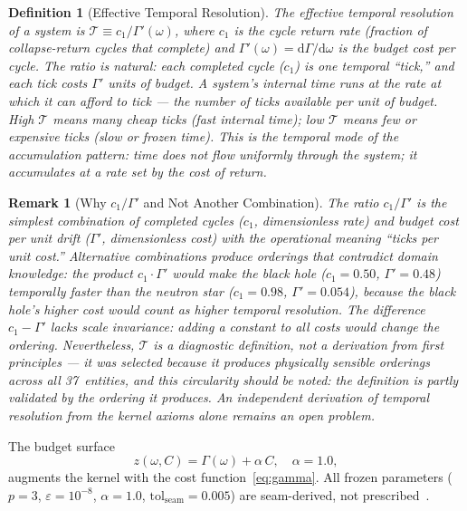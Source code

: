 \documentclass[
  aps,
  prd,
  twocolumn,
  superscriptaddress,
  nofootinbib,
  floatfix
]{revtex4-2}
\newtheorem{definition}[theorem]{Definition}
\newtheorem{remark}{Remark}
\newcommand{\Gam}{\Gamma}
\newcommand{\eps}{\varepsilon}
\newcommand{\tolseam}{\mathrm{tol}_{\mathrm{seam}}}
\newcommand{\dd}{\mathrm{d}}
\newcommand{\beq}{\begin{equation}}
\newcommand{\eeq}{\end{equation}}
\begin{document}
\begin{definition}[Effective Temporal Resolution]\label{def:temporal}
The \emph{effective temporal resolution} of a system is
$\mathcal{T} \equiv c_1 / \Gam'(\omega)$,
where $c_1$ is the cycle return rate (fraction of
collapse-return cycles that complete) and $\Gam'(\omega) =
\dd\Gam/\dd\omega$ is the budget cost per cycle.  The ratio
is natural: each completed cycle ($c_1$) is one temporal
``tick,'' and each tick costs $\Gam'$ units of budget.  A
system's internal time runs at the rate at which it can
afford to tick --- the number of ticks available per unit of
budget.  High $\mathcal{T}$ means many cheap ticks (fast
internal time); low $\mathcal{T}$ means few or expensive
ticks (slow or frozen time).  This is the temporal mode of
the accumulation pattern: time does not flow uniformly
through the system; it accumulates at a rate set by the cost
of return.
\end{definition}

\begin{remark}[Why $c_1/\Gam'$ and Not Another Combination]
\label{rem:temporal_choice}
The ratio $c_1/\Gam'$ is the simplest combination of
completed cycles ($c_1$, dimensionless rate) and budget cost
per unit drift ($\Gam'$, dimensionless cost) with the
operational meaning ``ticks per unit cost.''
Alternative combinations produce orderings that contradict
domain knowledge: the product $c_1 \cdot \Gam'$ would make
the black hole ($c_1 = 0.50$, $\Gam' = 0.48$) temporally
\emph{faster} than the neutron star ($c_1 = 0.98$,
$\Gam' = 0.054$), because the black hole's higher cost
would count as higher temporal resolution.  The difference
$c_1 - \Gam'$ lacks scale invariance: adding a constant to
all costs would change the ordering.  Nevertheless,
$\mathcal{T}$ is a \emph{diagnostic definition}, not a
derivation from first principles --- it was selected because
it produces physically sensible orderings across all
37~entities, and this circularity should be noted: the
definition is partly validated by the ordering it produces.
An independent derivation of temporal resolution from the
kernel axioms alone remains an open problem.
\end{remark}

The budget surface
\beq\label{eq:surface}
  z(\omega, C) = \Gam(\omega) + \alpha \, C,
  \quad \alpha = 1.0,
\eeq
augments the kernel with the cost function~\eqref{eq:gamma}.
All frozen parameters ($p = 3$, $\eps = 10^{-8}$,
$\alpha = 1.0$, $\tolseam = 0.005$) are seam-derived, not
prescribed~\cite{paulus2025episteme}.
\end{document}
